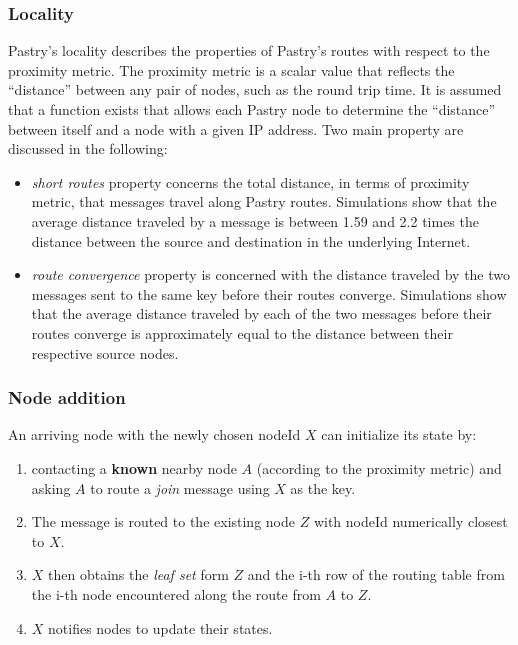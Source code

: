 \documentclass[a4paper,12pt]{article}
\begin{document}
\subsubsection{Locality}
Pastry’s locality describes the properties of Pastry’s routes with respect to the proximity metric. The proximity metric is a scalar value that reflects the “distance” between any pair of nodes, such as the round trip time. It is assumed that a function exists that allows each Pastry node to determine the “distance” between itself and a node with a given IP address. Two main property are discussed in the following:
\begin{itemize}
  \item \textit{short routes} property concerns the total distance, in terms of proximity metric, that messages travel along Pastry routes. Simulations show that the average distance traveled by a message is between 1.59 and 2.2 times the distance between the source and destination in the underlying Internet.
  \item \textit{route convergence} property is concerned with the distance traveled by the two messages sent to the same key before their routes converge. Simulations show that the average distance traveled by each of the two messages before their routes converge is approximately equal to the distance between their respective source nodes.
\end{itemize}

\subsubsection{Node addition}
An arriving node with the newly chosen nodeId $X$ can initialize its state by:
\begin{enumerate}
  \item contacting a \textbf{known} nearby node $A$ (according to the proximity metric) and asking $A$ to route a \textit{join} message using $X$ as the key.
  \item The message is routed to the existing node $Z$ with nodeId numerically closest to $X$.
  \item $X$ then obtains the \textit{leaf set} form $Z$ and the i-th row of the routing table from the i-th node encountered along the route from $A$ to $Z$.
  \item $X$ notifies nodes to update their states.
\end{enumerate}
\end{document}
